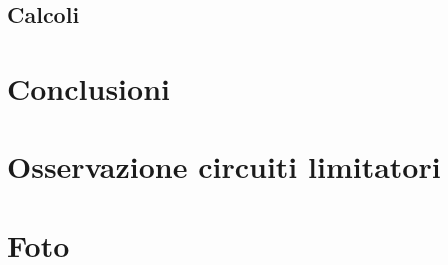 \documentclass[12pt]{article}
\begin{document}
    \subsection{Calcoli}
    \section{Conclusioni}
\section{Osservazione circuiti limitatori}
\section{Foto}
    
\end{document}
